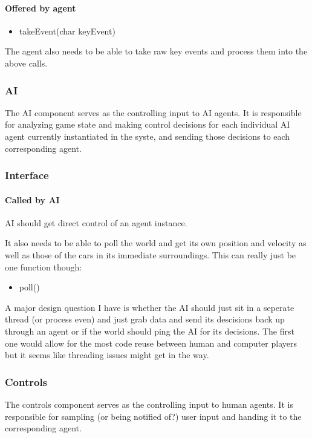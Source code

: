 \documentclass[12pt]{article}
\begin{document}
\paragraph{Offered by agent}
\begin{itemize}
\item takeEvent(char keyEvent)
\end{itemize}
The agent also needs to be able to take raw key events and process them into the above calls.

\subsubsection{AI}
The AI component serves as the controlling input to AI agents. It is responsible
for analyzing game state and making control decisions for each individual AI
agent currently instantiated in the syste, and sending those decisions to
each corresponding agent.

\subsubsection{Interface}

\paragraph{Called by AI}
AI should get direct control of an agent instance.

It also needs to be able to poll the world and get its own position and velocity as well as those of the cars in its immediate surroundings. This can really just be one function though:
\begin{itemize}
\item poll()
\end{itemize}
A major design question I have is whether the AI should just sit in a seperate thread (or process even) and just grab data and send its descisions back up through an agent or if the world should ping the AI for its decisions. The first one would allow for the most code reuse between human and computer players but it seems like threading issues might get in the way.

\subsubsection{Controls}
The controls component serves as the controlling input to human agents. It
is responsible for sampling (or being notified of?) user input and handing it
to the corresponding agent.
\end{document}

